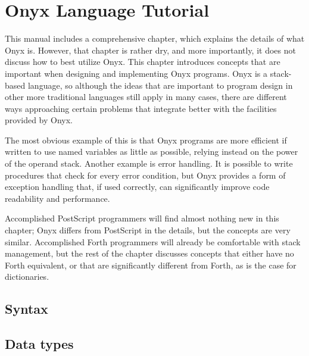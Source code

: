 %
%
%
%
%

\clearemptydoublepage
\chapter{Onyx Language Tutorial}
\label{onyxtut}

This manual includes a comprehensive 
chapter, which explains the details of what Onyx is.  However, that chapter is
rather dry, and more importantly, it does not discuss how to best utilize Onyx.
This chapter introduces concepts that are important when designing and
implementing Onyx programs.  Onyx is a stack-based language, so although the
ideas that are important to program design in other more traditional languages
still apply in many cases, there are different ways approaching certain problems
that integrate better with the facilities provided by Onyx.

The most obvious example of this is that Onyx programs are more efficient if
written to use named variables as little as possible, relying instead on the
power of the operand stack.  Another example is error handling.  It is possible
to write procedures that check for every error condition, but Onyx provides a
form of exception handling that, if used correctly, can significantly improve
code readability and performance.

Accomplished PostScript programmers will find almost nothing new in this
chapter; Onyx differs from PostScript in the details, but the concepts are very
similar.  Accomplished Forth programmers will already be comfortable with stack
management, but the rest of the chapter discusses concepts that either have no
Forth equivalent, or that are significantly different from Forth, as is the case
for dictionaries.

\section{Syntax}

\section{Data types}

